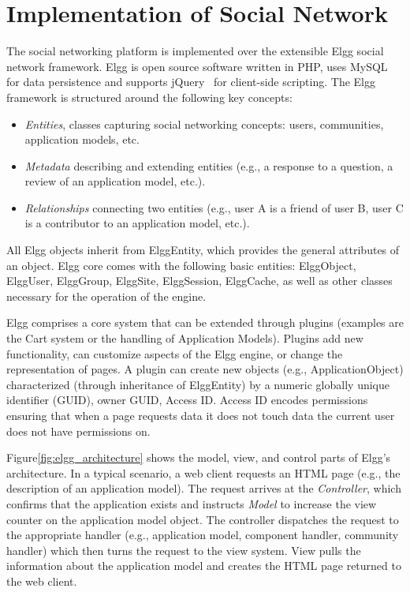 \section{Implementation of Social Network}
\label{sec:implementaion_of_social_netowrk}
The social networking platform is implemented over the extensible Elgg social network framework\cite{elgg_url}.  Elgg is open source software written in PHP, uses MySQL for data persistence and supports jQuery~\cite{jquery_url} for client-side scripting.  The Elgg framework is structured around the following key concepts:
\begin{itemize}
\item \emph{Entities}, classes capturing social networking concepts: users, communities, application models, etc.
\item \emph{Metadata} describing and extending entities (e.g., a response to a question, a review of an application model, etc.).
\item  \emph{Relationships} connecting two entities (e.g., user A is a friend of user B, user C is a contributor to an application model, etc.).
\end{itemize}
All Elgg objects inherit from ElggEntity, which provides the general attributes of an object. Elgg core comes with the following basic entities: ElggObject, ElggUser, ElggGroup, ElggSite, ElggSession, ElggCache, as well as other classes necessary for the operation of the engine.

Elgg comprises a core system that can be extended through plugins (examples are the Cart system or the handling of Application Models). Plugins add new functionality, can customize aspects of the Elgg engine, or change the representation of pages.
A plugin can create new objects (e.g., ApplicationObject) characterized (through inheritance of ElggEntity) by a numeric globally unique identifier (GUID), owner GUID, Access ID. Access ID encodes permissions ensuring that when a page requests data it does not touch data the current user does not have permissions on. 

Figure\ref{fig:elgg_architecture} shows the model, view, and control parts of Elgg's architecture. In a typical scenario, a web client requests an HTML page (e.g., the description of an application model).  The request arrives at the \emph{Controller}, which confirms that the application exists and instructs \emph{Model} to increase the view counter on the application model object. The controller dispatches the request to the appropriate handler (e.g., application model, component handler, community handler) which then turns the request to the view system. View pulls the information about the application model and creates the HTML page returned to the web client.

